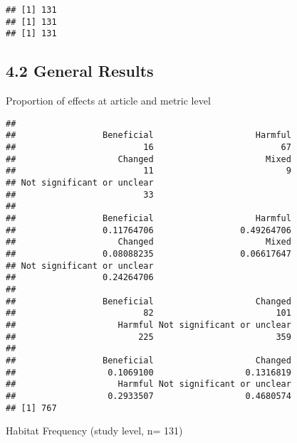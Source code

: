 \documentclass[
]{article}
\newenvironment{Shaded}{\begin{snugshade}}{\end{snugshade}}
\newcommand{\CommentTok}[1]{\textcolor[rgb]{0.56,0.35,0.01}{\textit{#1}}}
\newcommand{\KeywordTok}[1]{\textcolor[rgb]{0.13,0.29,0.53}{\textbf{#1}}}
\newcommand{\NormalTok}[1]{#1}
\newcommand{\OperatorTok}[1]{\textcolor[rgb]{0.81,0.36,0.00}{\textbf{#1}}}
\begin{document}
\begin{verbatim}
## [1] 131
## [1] 131
## [1] 131
\end{verbatim}

\hypertarget{general-results}{%
\subsection{4.2 General Results}\label{general-results}}

Proportion of effects at article and metric level

\begin{Shaded}
\end{Shaded}

\begin{verbatim}
## 
##                 Beneficial                    Harmful 
##                         16                         67 
##                    Changed                      Mixed 
##                         11                          9 
## Not significant or unclear 
##                         33 
## 
##                 Beneficial                    Harmful 
##                 0.11764706                 0.49264706 
##                    Changed                      Mixed 
##                 0.08088235                 0.06617647 
## Not significant or unclear 
##                 0.24264706 
## 
##                 Beneficial                    Changed 
##                         82                        101 
##                    Harmful Not significant or unclear 
##                        225                        359 
## 
##                 Beneficial                    Changed 
##                  0.1069100                  0.1316819 
##                    Harmful Not significant or unclear 
##                  0.2933507                  0.4680574 
## [1] 767
\end{verbatim}

Habitat Frequency (study level, n= 131)
\end{document}
